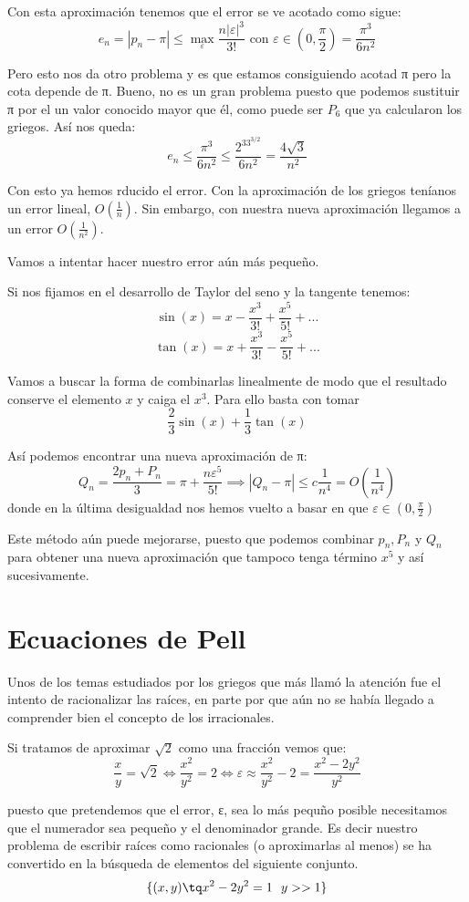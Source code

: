 \documentclass{apuntes}
\begin{document}
Con esta aproximación tenemos que el error se ve acotado como sigue:
\[e_n = |p_n-π| \leq \max_ε \frac{n|ε|^3}{3!} \text{ con } ε \in \left( 0, \frac{π}{2} \right) = \frac{π^3}{6n^2}\]

Pero esto nos da otro problema y es que estamos consiguiendo acotad π pero la cota depende de π. Bueno, no es un gran problema puesto que podemos sustituir π por el un valor conocido mayor que él, como puede ser $P_6$ que ya calcularon los griegos. Así nos queda:
\[e_n \leq \frac{π^3}{6n^2} \leq \frac{2^33^{3/2}}{6n^2}=\frac{4\sqrt{3}}{n^2}\]

Con esto ya hemos rducido el error. Con la aproximación de los griegos teníanos un error lineal, $O\left( \frac{1}{n}\right)$. Sin embargo, con nuestra nueva aproximación llegamos a un error $O\left( \frac{1}{n^2}\right)$.

Vamos a intentar hacer nuestro error aún más pequeño.

Si nos fijamos en el desarrollo de Taylor del seno y la tangente tenemos:
\[\sin(x)=x-\frac{x^3}{3!}+\frac{x^5}{5!}+...\]
\[\tan(x)=x+\frac{x^3}{3!}-\frac{x^5}{5!}+...\]

Vamos a buscar la forma de combinarlas linealmente de modo que el resultado conserve el elemento $x$ y caiga el $x^3$. Para ello basta con tomar
\[\frac{2}{3}\sin(x)+\frac{1}{3}\tan(x)\]

Así podemos encontrar una nueva aproximación de π:
\[Q_n = \frac{2p_n+P_n}{3} = π + \frac{nε^5}{5!} \implies |Q_n-π| \leq c\frac{1}{n^4}=O\left( \frac{1}{n^4}\right)\]
donde en la última desigualdad nos hemos vuelto a basar en que $ε\in\left( 0, \frac{π}{2} \right)$

Este método aún puede mejorarse, puesto que podemos combinar $p_n,P_n$ y $Q_n$ para obtener una nueva aproximación que tampoco tenga término $x^5$ y así sucesivamente.

\chapter{Ecuaciones de Pell}
Unos de los temas estudiados por los griegos que más llamó la atención fue el intento de racionalizar las raíces, en parte por que aún no se había llegado a comprender bien el concepto de los irracionales.

Si tratamos de aproximar $\sqrt{2}$ como una fracción vemos que:
\[\frac{x}{y} = \sqrt{2} \iff \frac{x^2}{y^2} = 2 \iff ε \approx \frac{x^2}{y^2} - 2 = \frac{x^2-2y^2}{y^2}\]

puesto que pretendemos que el error, ε, sea lo más pequño posible necesitamos que el numerador sea pequeño y el denominador grande. Es decir nuestro problema de escribir raíces como racionales (o aproximarlas al menos) se ha convertido en la búsqueda de elementos del siguiente conjunto.
\[\{(x,y) \tq x^2-2y^2 = 1 \ \ y >> 1\}\]
\end{document}
